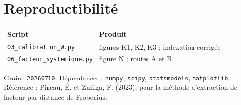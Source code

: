 \documentclass[11pt,a4paper]{article}
\begin{document}
\section*{Reproductibilité}

\begin{center}
\small
\begin{tabular}{ll}
\toprule
\textbf{Script} & \textbf{Produit} \\
\midrule
\texttt{03\_calibration\_W.py} & figures K1, K2, K3 ; indexation corrigée \\
\texttt{06\_facteur\_systemique.py} & figure N ; routes A et B \\
\bottomrule
\end{tabular}
\end{center}

\medskip
\noindent
\small
Graine \texttt{20260710}. Dépendances : \texttt{numpy}, \texttt{scipy}, \texttt{statsmodels},
\texttt{matplotlib}. Référence : Pineau, É. et Zuñiga, F. (2023), pour la méthode d'extraction
de facteur par distance de Frobenius.
\end{document}
